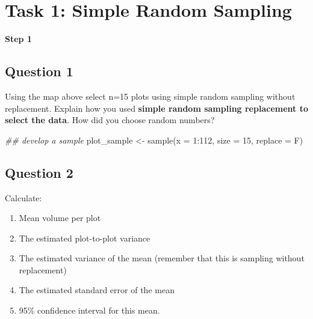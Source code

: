 \documentclass[
  letterpaper,
]{book}
\newenvironment{Shaded}{\begin{snugshade}}{\end{snugshade}}
\newcommand{\AttributeTok}[1]{\textcolor[rgb]{0.40,0.45,0.13}{#1}}
\newcommand{\DecValTok}[1]{\textcolor[rgb]{0.68,0.00,0.00}{#1}}
\newcommand{\DocumentationTok}[1]{\textcolor[rgb]{0.37,0.37,0.37}{\textit{#1}}}
\newcommand{\FunctionTok}[1]{\textcolor[rgb]{0.28,0.35,0.67}{#1}}
\newcommand{\NormalTok}[1]{\textcolor[rgb]{0.00,0.23,0.31}{#1}}
\newcommand{\OtherTok}[1]{\textcolor[rgb]{0.00,0.23,0.31}{#1}}
\newcommand{\SpecialCharTok}[1]{\textcolor[rgb]{0.37,0.37,0.37}{#1}}
\providecommand{\tightlist}{%
  \setlength{\itemsep}{0pt}\setlength{\parskip}{0pt}}\usepackage{longtable,booktabs,array}
\begin{document}
\hypertarget{task-1-simple-random-sampling}{%
\section*{Task 1: Simple Random
Sampling}\label{task-1-simple-random-sampling}}


\textbf{Step 1}

\hypertarget{question-1-2}{%
\subsection*{Question 1}\label{question-1-2}}

Using the map above select n=15 plots using simple random sampling
without replacement. Explain how you used \textbf{simple random sampling
replacement to select the data}. How did you choose random numbers?

\begin{Shaded}
\begin{Highlighting}[]
\DocumentationTok{\#\# develop a sample }
\NormalTok{plot\_sample }\OtherTok{\textless{}{-}} \FunctionTok{sample}\NormalTok{(}\AttributeTok{x =} \DecValTok{1}\SpecialCharTok{:}\DecValTok{112}\NormalTok{, }\AttributeTok{size =} \DecValTok{15}\NormalTok{, }\AttributeTok{replace =}\NormalTok{ F)}
\end{Highlighting}
\end{Shaded}

\hypertarget{question-2-2}{%
\subsection*{Question 2}\label{question-2-2}}

Calculate:

\begin{enumerate}
\def\labelenumi{\arabic{enumi}.}
\tightlist
\item
  Mean volume per plot
\item
  The estimated plot-to-plot variance
\item
  The estimated variance of the mean (remember that this is sampling
  without replacement)
\item
  The estimated standard error of the mean
\item
  95\% confidence interval for this mean.
\end{enumerate}
\end{document}
